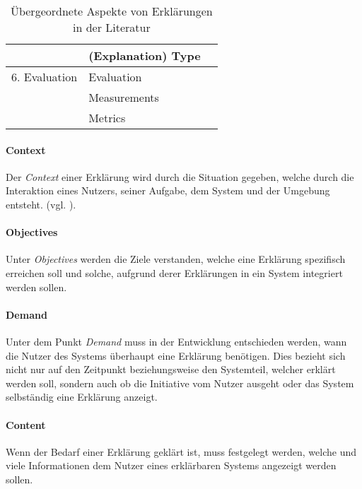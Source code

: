 \begin{table}
\begin{tabular}{|p{}|p{}|p{}|}
                        & (Explanation) Type    & \cite{ribera2019can} \cite{rosenfeld_explainability_2019} \\
        \hline
        6. Evaluation      & Evaluation            & \cite{kohl_explainability_2019} \cite{doshi2017towards} \\
                        & Measurements          & \cite{waa_evaluating_2021} \cite{balog_measuring_2020} \\
                        & Metrics               & \cite{nunes_systematic_2017} \cite{anjomshoae2019explainable}
                                                  \cite{chari_explanation_2020} \cite{waa_evaluating_2021}\\
        \hline
    \end{tabular}
\caption{Übergeordnete Aspekte von Erklärungen in der Literatur}
\label{tab:model_explaination_aspects}
\end{table}

\paragraph{Context} Der \textit{Context} einer Erklärung wird durch die Situation gegeben, welche durch die Interaktion eines Nutzers, seiner Aufgabe, dem System und der Umgebung entsteht. (vgl. \cite{chazette_knowledge_nodate, kohl_explainability_2019}).

\paragraph{Objectives} Unter \textit{Objectives} werden die Ziele verstanden, welche eine Erklärung spezifisch erreichen soll und solche, aufgrund derer Erklärungen in ein System integriert werden sollen.

\paragraph{Demand} Unter dem Punkt \textit{Demand} muss in der Entwicklung entschieden werden, wann die Nutzer des Systems überhaupt eine Erklärung benötigen. Dies bezieht sich nicht nur auf den Zeitpunkt beziehungsweise den Systemteil, welcher erklärt werden soll, sondern auch ob die Initiative vom Nutzer ausgeht oder das System selbständig eine Erklärung anzeigt.

\paragraph{Content} Wenn der Bedarf einer Erklärung geklärt ist, muss festgelegt werden, welche und viele Informationen dem Nutzer eines erklärbaren Systems angezeigt werden sollen.

